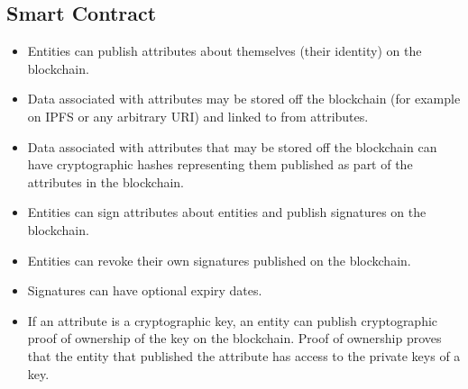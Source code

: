 \documentclass[a4paper]{report}
\begin{document}
	\subsection{Smart Contract}
	\begin{itemize}
		\item Entities can publish attributes about themselves (their identity) on the blockchain.
		\item Data associated with attributes may be stored off the blockchain (for example on IPFS or any arbitrary URI) and linked to from attributes.
		\item Data associated with attributes that may be stored off the blockchain can have cryptographic hashes representing them published as part of the attributes in the blockchain.
		\item Entities can sign attributes about entities and publish signatures on the blockchain.
		\item Entities can revoke their own signatures published on the blockchain.
		\item Signatures can have optional expiry dates.
		\item If an attribute is a cryptographic key, an entity can publish cryptographic proof of ownership of the key on the blockchain. Proof of ownership proves that the entity that published the attribute has access to the private keys of a key.
	\end{itemize}
	
\end{document}

